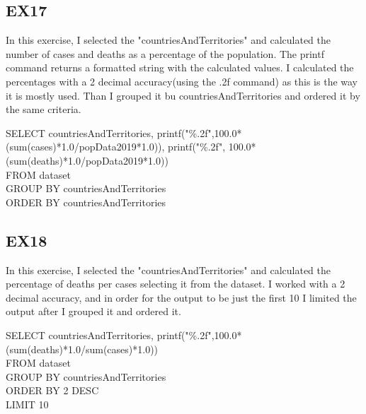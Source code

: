 \documentclass{article}
\begin{document}
\subsection{EX17}
In this exercise, I selected the "countriesAndTerritories" and calculated the number of cases and deaths as a percentage of the population. The printf command returns a formatted string with the calculated values. I calculated the percentages with a 2 decimal accuracy(using the .2f command) as this is the way it is mostly used. Than I grouped it bu countriesAndTerritories and ordered it by the same criteria.
\begin{algorithm}
SELECT countriesAndTerritories, printf("\%.2f",100.0*(sum(cases)*1.0/popData2019*1.0)), printf("\%.2f", 100.0*(sum(deaths)*1.0/popData2019*1.0)) \\
FROM dataset \\
GROUP BY countriesAndTerritories \\
ORDER BY countriesAndTerritories
\end{algorithm}

\subsection{EX18}
In this exercise, I selected the "countriesAndTerritories" and calculated the percentage of deaths per cases selecting it from the dataset. I worked with a 2 decimal accuracy, and in order for the output to be just the first 10 I limited the output after I grouped it and ordered it.
\begin{algorithm}
SELECT countriesAndTerritories, printf("\%.2f",100.0*(sum(deaths)*1.0/sum(cases)*1.0)) \\
FROM dataset \\
GROUP BY countriesAndTerritories \\
ORDER BY 2 DESC \\
LIMIT 10
\end{algorithm} \par
\end{document}
